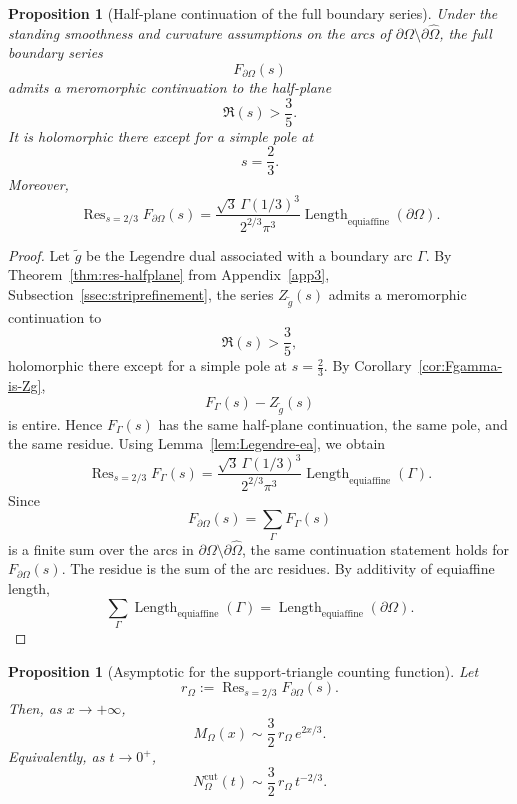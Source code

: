 \documentclass[a4paper,american,11pt]{amsart}
\theoremstyle{plain}
\newtheorem{proposition}[theorem]{Proposition}
\theoremstyle{definition}
\DeclareMathOperator*{\Res}{Res}
\DeclareMathOperator{\Length}{Length}
\begin{document}
\begin{proposition}[Half-plane continuation of the full boundary series]
\label{prop:Fboundary-halfplane-app}
Under the standing smoothness and curvature assumptions on the arcs of
\(\partial\Omega\setminus\partial\widehat\Omega\), the full boundary series
\[
F_{\partial\Omega}(s)
\]
admits a meromorphic continuation to the half-plane
\[
\Re(s)>\frac35.
\]
It is holomorphic there except for a simple pole at
\[
s=\frac23.
\]
Moreover,
\[
\Res_{s=2/3}F_{\partial\Omega}(s)
=
\frac{\sqrt3\,\Gamma(1/3)^3}{2^{2/3}\pi^3}
\Length_{\mathrm{equiaffine}}(\partial\Omega).
\]
\end{proposition}


\begin{proof}
Let \(\widetilde g\) be the Legendre dual associated with a boundary arc
\(\Gamma\). By Theorem~\ref{thm:res-halfplane} from
Appendix~\ref{app3}, Subsection~\ref{ssec:striprefinement},
the series \(Z_{\widetilde g}(s)\) admits a meromorphic continuation to
\[
\Re(s)>\frac35,
\]
holomorphic there except for a simple pole at \(s=\frac23\). By
Corollary~\ref{cor:Fgamma-is-Zg},
\[
F_\Gamma(s)-Z_{\widetilde g}(s)
\]
is entire. Hence \(F_\Gamma(s)\) has the same half-plane continuation, the
same pole, and the same residue. Using
Lemma~\ref{lem:Legendre-ea}, we obtain
\[
\Res_{s=2/3}F_\Gamma(s)
=
\frac{\sqrt3\,\Gamma(1/3)^3}{2^{2/3}\pi^3}
\Length_{\mathrm{equiaffine}}(\Gamma).
\]
Since
\[
F_{\partial\Omega}(s)=\sum_\Gamma F_\Gamma(s)
\]
is a finite sum over the arcs in
\(\partial\Omega\setminus\partial\widehat\Omega\), the same continuation
statement holds for \(F_{\partial\Omega}(s)\).  The residue is the sum of the
arc residues.  By additivity of equiaffine length,
\[
\sum_\Gamma \Length_{\mathrm{equiaffine}}(\Gamma)
=
\Length_{\mathrm{equiaffine}}(\partial\Omega).
\]
\end{proof}

\begin{proposition}[Asymptotic for the support-triangle counting function]
\label{prop:Aomega-tauberian}
Let
\[
r_\Omega:=\Res_{s=2/3}F_{\partial\Omega}(s).
\]
Then, as \(x\to+\infty\),
\[
M_\Omega(x)\sim \frac32\,r_\Omega\,e^{2x/3}.
\]
Equivalently, as \(t\to0^+\),
\[
N^{\mathrm{cut}}_\Omega(t)\sim \frac32\,r_\Omega\,t^{-2/3}.
\]
\end{proposition}
\end{document}
